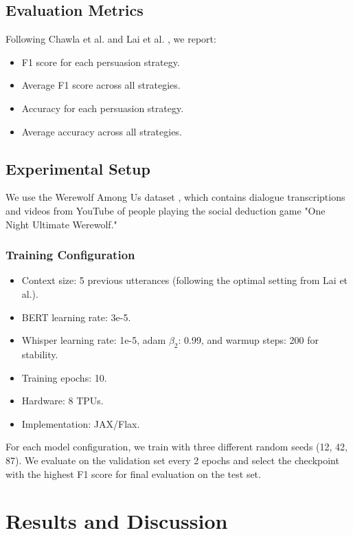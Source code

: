 \documentclass{article}
\begin{document}
\subsection{Evaluation Metrics}
Following Chawla et al. \cite{chawla2021casino} and Lai et al. \cite{lai2022werewolf}, we report:
\begin{itemize}
    \item F1 score for each persuasion strategy.
    \item Average F1 score across all strategies.
    \item Accuracy for each persuasion strategy.
    \item Average accuracy across all strategies.
\end{itemize}

\subsection{Experimental Setup}
We use the Werewolf Among Us dataset \cite{lai2022werewolf}, which contains dialogue transcriptions and videos from YouTube of people playing the social deduction game "One Night Ultimate Werewolf." 

\subsubsection{Training Configuration}
\begin{itemize}
    \item Context size: 5 previous utterances (following the optimal setting from Lai et al.).
    \item BERT learning rate: 3e-5.
    \item Whisper learning rate: 1e-5, adam $\beta_2$: 0.99, and warmup steps: 200 for stability.
    \item Training epochs: 10.
    \item Hardware: 8 TPUs.
    \item Implementation: JAX/Flax.
\end{itemize}

For each model configuration, we train with three different random seeds (12, 42, 87). We evaluate on the validation set every 2 epochs and select the checkpoint with the highest F1 score for final evaluation on the test set.

\section{Results and Discussion}
\end{document}
